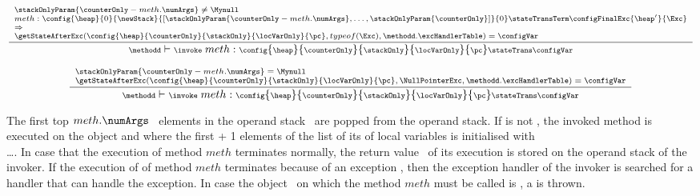 \begin{itemize}
	  $${\scriptsize \frac{\begin{array}{l}
	                        \stackOnlyParam{ \counterOnly - meth.\numArgs } \neq \Mynull   \\
	                         meth: %
			                        \config{\heap}       
                                                       {0}
						       {\newStack }
                                                       {\lbrack \stackOnlyParam{ \counterOnly - meth.\numArgs },\ldots ,\stackOnlyParam{ \counterOnly} \rbrack }
						       {0} 
						         \stateTransTerm 
						       \configFinalExc{\heap'}{\Exc}\\
					   \Rightarrow \\
					  \getStateAfterExc( \config{\heap}{\counterOnly}{\stackOnly}{\locVarOnly}{\pc}, typeof(\Exc)  ,\methodd.\excHandlerTable ) =  \configVar
	         \end{array} 	      
	         }	         
	         {\methodd \vdash \invoke \  meth :  \config{\heap}{\counterOnly}{\stackOnly}{\locVarOnly}{\pc} 
		                        \stateTrans  
					\configVar} } $$


	  $${\scriptsize \frac{\begin{array}{l}
	                         \stackOnlyParam{ \counterOnly - meth.\numArgs } = \Mynull   \\ 
				 \getStateAfterExc( \config{\heap}{\counterOnly}{\stackOnly}{\locVarOnly}{\pc},\NullPointerExc,\methodd.\excHandlerTable ) =  \configVar
	         \end{array} 	      
	         }	         
	         {\methodd \vdash \invoke \  meth :  \config{\heap}{\counterOnly}{\stackOnly}{\locVarOnly}{\pc} 
		                        \stateTrans  
					\configVar} } $$					
	  

	 The first top $meth.\numArgs$ \ elements in the operand stack \stackOnly \ are popped from the operand stack. If 
          is not \Mynull, the invoked method is executed on the object    
	 and where the first \numArgs + 1 elements of the list of its of local variables is initialised with \\
          \ldots \stackOnlyParam{\counterOnly}. In case that the execution of method $meth$
	 terminates normally, the return value \Res \  of its execution is stored on the operand stack of the invoker. 
	 If the execution of of method $meth$ terminates because of an exception \Exc, then the exception handler of the invoker is searched for
	 a handler that can handle the exception. In case the object   \  on which the  method $meth$ must be 
	 called is \Mynull, a \NullPointerExc is thrown.  			





\end{itemize}
